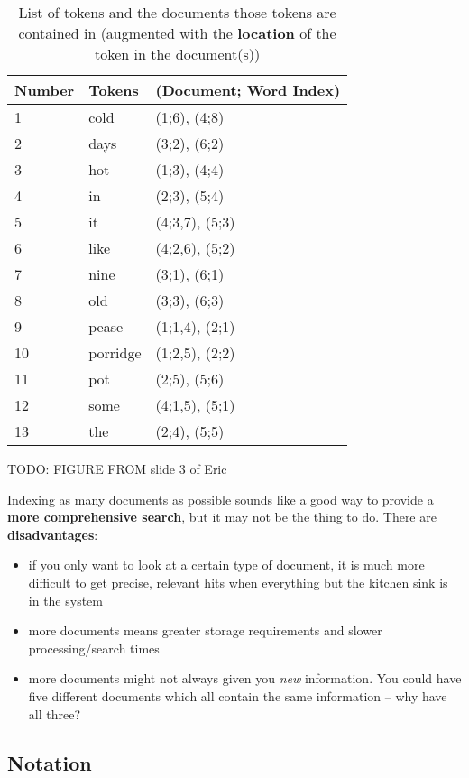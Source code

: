 \documentclass{article}
\begin{document}
\begin{table}
	\centering
	\begin{tabular}{|l|l|l|}
		\hline
		\textbf{Number} & \textbf{Tokens} & \textbf{(Document; Word Index)} \\
		\hline		
		1 & cold & (1;6), (4;8) \\
		2 & days & (3;2), (6;2) \\
		3 & hot & (1;3), (4;4) \\
		4 & in & (2;3), (5;4) \\
		5 & it & (4;3,7), (5;3) \\
		6 & like & (4;2,6), (5;2) \\
		7 & nine & (3;1), (6;1) \\
		8 & old & (3;3), (6;3) \\
		9 & pease & (1;1,4), (2;1) \\
		10 & porridge & (1;2,5), (2;2) \\		
		11 & pot & (2;5), (5;6) \\
		12 & some & (4;1,5), (5;1) \\
		13 & the & (2;4), (5;5) \\	
		\hline
	\end{tabular}
	\caption{List of tokens and the documents those tokens are contained in (augmented with the \textbf{location} of the token in the document(s))}
	\label{tab:word-doc-sophisticated}
\end{table}

TODO: FIGURE FROM slide 3 of Eric

Indexing as many documents as possible sounds like a good way to provide a \textbf{more comprehensive search}, but it may not be the thing to do.  There are \textbf{disadvantages}:
\begin{itemize}
	\item if you only want to look at a certain type of document, it is much more difficult to get precise, relevant hits when everything but the kitchen sink is in the system
	\item more documents means greater storage requirements and slower processing/search times
	\item more documents might not always given you \textit{new} information. You could have five different documents which all contain the same information -- why have all three?
\end{itemize}

\subsection{Notation}
\end{document}
